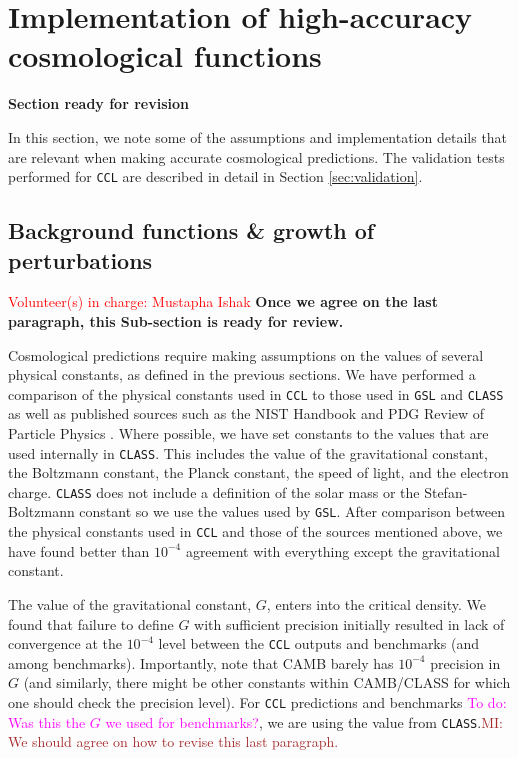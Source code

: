 \documentclass[\docopts]{\docclass}
\newcommand{\todo}[1]{\textcolor{magenta}{To do: #1}}
\newcommand{\vol}[1]{\textcolor{red}{Volunteer(s) in charge: #1}}
\newcommand{\cont}[1]{\textcolor{blue}{Suggested content: #1}}
\newcommand{\revise}{\textcolor{red!55!blue}{\bf Section ready for revision}}
\newcommand{\mi}[1]{\textcolor{brown}{MI: #1}}
\newcommand{\ccl}{{\tt CCL}\xspace}
\begin{document}
\section{Implementation of high-accuracy cosmological functions}
\label{sec:implement}
\revise

In this section, we note some of the assumptions and implementation details that are relevant when making accurate cosmological predictions. The validation tests performed for {\tt CCL} are described in detail in Section \ref{sec:validation}.

\subsection{Background functions \& growth of perturbations}
\vol{Mustapha Ishak}
\label{sec:distances}
{\textcolor{red!55!blue}{\bf Once we agree on the last paragraph, this Sub-section is ready for review.}}


Cosmological predictions require making assumptions on the values of several physical constants, as defined in the previous sections. We have performed a comparison of the physical constants used in \ccl to those used in {\tt GSL} and {\tt CLASS} as well as published sources such as the NIST Handbook and PDG Review of Particle Physics \citep{Beringer:1900zz}. Where possible, we have set constants to the values that are used internally in {\tt CLASS}. This includes the value of the gravitational constant, the Boltzmann constant, the Planck constant, the speed of light, and the electron charge. {\tt CLASS} does not include a definition of the solar mass or the Stefan-Boltzmann constant so we use the values used by {\tt GSL}. After comparison between the physical constants used in \ccl and those of the sources mentioned above, we have found better than $10^{-4}$ agreement with everything except the gravitational constant.

The value of the gravitational constant, $G$, enters into the critical density. We found that failure to define $G$ with sufficient precision initially resulted in lack of convergence at the $10^{-4}$ level between the \ccl outputs and benchmarks (and among benchmarks). Importantly, note that CAMB barely has $10^{-4}$ precision in $G$ (and similarly, there might be other constants within CAMB/CLASS for which one should check the precision level). For \ccl predictions and benchmarks \todo{Was this the $G$ we used for benchmarks?}, we are using the value from {\tt CLASS}.\mi{We should agree on how to revise this last paragraph.}
\end{document}
